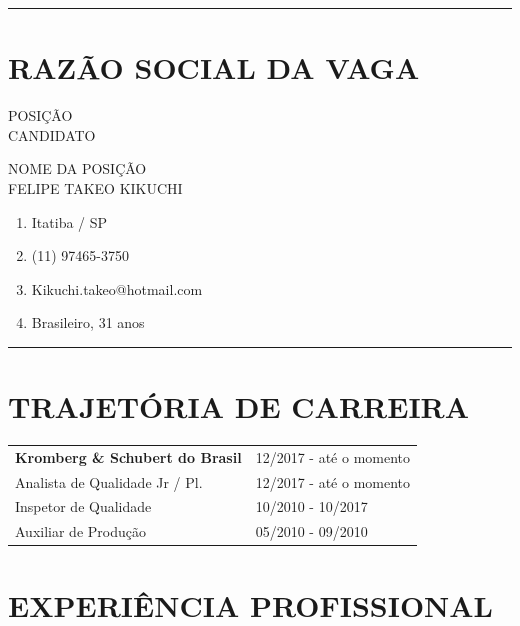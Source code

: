 \documentclass[10.5pt, a4paper]{report}
\begin{document}
\rule{\textwidth}{0.1pt}\vspace{-10pt}

\section{RAZÃO SOCIAL DA VAGA}

\begin{minipage}[t]{0.3\textwidth}
  POSIÇÃO \\
  CANDIDATO
\end{minipage}%
\begin{minipage}[t]{0.4\textwidth}
  NOME DA POSIÇÃO \\
  FELIPE TAKEO KIKUCHI
\end{minipage}


\vspace{5pt}


\begin{enumerate}[label={}, leftmargin=0pt, topsep=8pt, itemsep=0pt]
  \item Itatiba / SP
  \item (11) 97465-3750
  \item Kikuchi.takeo@hotmail.com
  \item Brasileiro, 31 anos
\end{enumerate}


\vspace{-5pt}
\rule{\textwidth}{0.1pt}\vspace{-10pt}

\section{TRAJETÓRIA DE CARREIRA}

{\renewcommand{\arraystretch}{1.6}
\begin{tabular}{@{}p{}p{}@{}}
\textbf{Kromberg \& Schubert do Brasil} & 12/2017 - até o momento \\
            Analista de Qualidade Jr / Pl. & 12/2017 - até o momento \\
        Inspetor de Qualidade & 10/2010 - 10/2017 \\
        Auxiliar de Produção & 05/2010 - 09/2010 \\
        \end{tabular}
        }


\section{EXPERIÊNCIA PROFISSIONAL}
\end{document}
